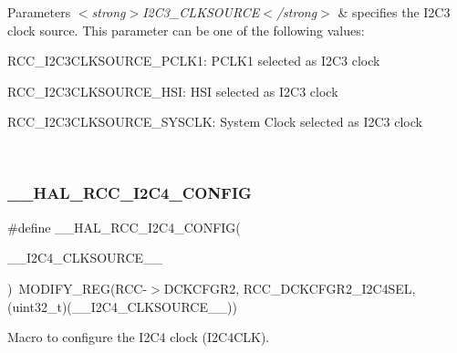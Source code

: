 \begin{DoxyParams}{Parameters}
{\em $<$strong$>$\+I2\+C3\+\_\+\+C\+L\+K\+S\+O\+U\+R\+C\+E$<$/strong$>$} & specifies the I2\+C3 clock source. This parameter can be one of the following values\+: \begin{DoxyItemize}
\item R\+C\+C\+\_\+\+I2\+C3\+C\+L\+K\+S\+O\+U\+R\+C\+E\+\_\+\+P\+C\+L\+K1\+: P\+C\+L\+K1 selected as I2\+C3 clock \item R\+C\+C\+\_\+\+I2\+C3\+C\+L\+K\+S\+O\+U\+R\+C\+E\+\_\+\+H\+SI\+: H\+SI selected as I2\+C3 clock \item R\+C\+C\+\_\+\+I2\+C3\+C\+L\+K\+S\+O\+U\+R\+C\+E\+\_\+\+S\+Y\+S\+C\+LK\+: System Clock selected as I2\+C3 clock \end{DoxyItemize}
\\
\hline
\end{DoxyParams}
\mbox{\label{group___r_c_c_ex___exported___macros_ga5ef626e39760793f37dd107f633c1404}} 
\subsubsection{\texorpdfstring{\_\_HAL\_RCC\_I2C4\_CONFIG}{\_\_HAL\_RCC\_I2C4\_CONFIG}}
{\footnotesize\ttfamily \#define \+\_\+\+\_\+\+H\+A\+L\+\_\+\+R\+C\+C\+\_\+\+I2\+C4\+\_\+\+C\+O\+N\+F\+IG(\begin{DoxyParamCaption}\item[{}]{\+\_\+\+\_\+\+I2\+C4\+\_\+\+C\+L\+K\+S\+O\+U\+R\+C\+E\+\_\+\+\_\+ }\end{DoxyParamCaption})~M\+O\+D\+I\+F\+Y\+\_\+\+R\+EG(R\+CC-\/$>$D\+C\+K\+C\+F\+G\+R2, R\+C\+C\+\_\+\+D\+C\+K\+C\+F\+G\+R2\+\_\+\+I2\+C4\+S\+EL, (uint32\+\_\+t)(\+\_\+\+\_\+\+I2\+C4\+\_\+\+C\+L\+K\+S\+O\+U\+R\+C\+E\+\_\+\+\_\+))}



Macro to configure the I2\+C4 clock (I2\+C4\+C\+LK). 


